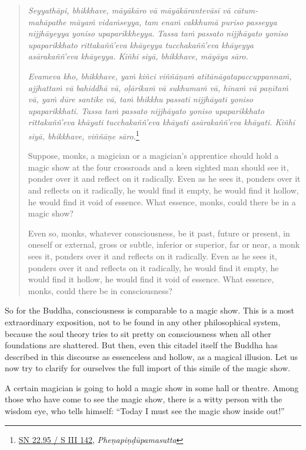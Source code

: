 \begin{quote}
\emph{Seyyathāpi, bhikkhave, māyākāro vā māyākārantevāsī vā cātum-\\ mahāpathe māyaṁ vidaṁseyya, tam enaṁ cakkhumā puriso passeyya nijjhāyeyya yoniso upaparikkheyya. Tassa taṁ passato nijjhāyato yoniso upaparikkhato rittakaññ'eva khāyeyya tucchakaññ'eva khāyeyya asārakaññ'eva khāyeyya. Kiñhi siyā, bhikkhave, māyāya sāro.}

\emph{Evameva kho, bhikkhave, yaṁ kiñci viññāṇaṁ atītānāgatapaccuppannaṁ, ajjhattaṁ vā bahiddhā vā, oḷārikaṁ vā sukhumaṁ vā, hīnaṁ vā paṇītaṁ vā, yaṁ dūre santike vā, taṁ bhikkhu passati nijjhāyati yoniso upaparikkhati. Tassa taṁ passato nijjhāyato yoniso upaparikkhato rittakaññ'eva khāyati tucchakaññ'eva khāyati asārakaññ'eva khāyati. Kiñhi siyā, bhikkhave, viññāṇe sāro.}\footnote{\href{https://suttacentral.net/sn22.95/pli/ms}{SN 22.95 / S III 142}, \emph{Pheṇapiṇḍūpamasutta}}

Suppose, monks, a magician or a magician's apprentice should hold a magic show at the four crossroads and a keen sighted man should see it, ponder over it and reflect on it radically. Even as he sees it, ponders over it and reflects on it radically, he would find it empty, he would find it hollow, he would find it void of essence. What essence, monks, could there be in a magic show?

Even so, monks, whatever consciousness, be it past, future or present, in oneself or external, gross or subtle, inferior or superior, far or near, a monk sees it, ponders over it and reflects on it radically. Even as he sees it, ponders over it and reflects on it radically, he would find it empty, he would find it hollow, he would find it void of essence. What essence, monks, could there be in consciousness?
\end{quote}

So for the Buddha, consciousness is comparable to a magic show. This is a most extraordinary exposition, not to be found in any other philosophical system, because the soul theory tries to sit pretty on consciousness when all other foundations are shattered. But then, even this citadel itself the Buddha has described in this discourse as essenceless and hollow, as a magical illusion. Let us now try to clarify for ourselves the full import of this simile of the magic show.

A certain magician is going to hold a magic show in some hall or theatre. Among those who have come to see the magic show, there is a witty person with the wisdom eye, who tells himself: ``Today I must see the magic show inside out!''

